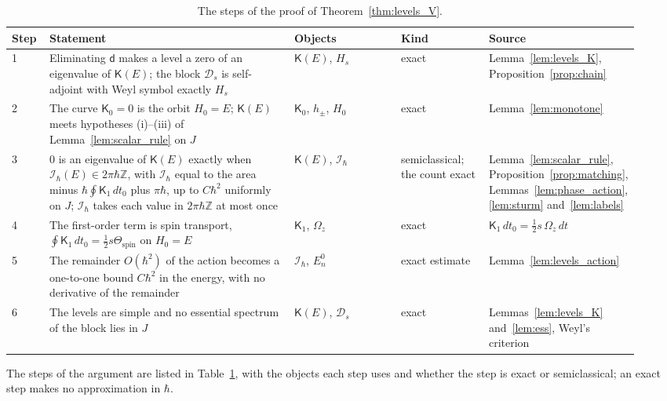 \documentclass[aps,prd,onecolumn,tightenlines,nofootinbib,notitlepage,11pt,floatfix]{revtex4-2}
\theoremstyle{indentedtheorem}
\begin{document}
\begin{table}[htbp]
\centering
\small
\setlength{\tabcolsep}{3pt}
\caption{The steps of the proof of Theorem~\ref{thm:levels_V}.}
\label{tab:proof_chain}
\begin{tabular}{p{0.06\linewidth}p{0.39\linewidth}p{0.17\linewidth}p{0.14\linewidth}p{0.17\linewidth}}
\hline
\textbf{Step} & \textbf{Statement} & \textbf{Objects} & \textbf{Kind} & \textbf{Source} \\
\hline
1 & Eliminating $\mathsf{d}$ makes a level a zero of an eigenvalue of $\mathsf{K}(E)$; the block $\mathcal{D}_s$ is self-adjoint with Weyl symbol exactly $H_s$ & $\mathsf{K}(E)$, $H_s$ & exact & Lemma~\ref{lem:levels_K}, Proposition~\ref{prop:chain} \\
2 & The curve $\mathsf{K}_0=0$ is the orbit $H_0=E$; $\mathsf{K}(E)$ meets hypotheses (i)--(iii) of Lemma~\ref{lem:scalar_rule} on $J$ & $\mathsf{K}_0$, $h_\pm$, $H_0$ & exact & Lemma~\ref{lem:monotone} \\
3 & $0$ is an eigenvalue of $\mathsf{K}(E)$ exactly when $\mathcal{I}_\hbar(E)\in2\pi\hbar\mathbb{Z}$, with $\mathcal{I}_\hbar$ equal to the area minus $\hbar\oint\mathsf{K}_1\,dt_0$ plus $\pi\hbar$, up to $C\hbar^2$ uniformly on $J$; $\mathcal{I}_\hbar$ takes each value in $2\pi\hbar\mathbb{Z}$ at most once & $\mathsf{K}(E)$, $\mathcal{I}_\hbar$ & semiclassical; the count exact & Lemma~\ref{lem:scalar_rule}, Proposition~\ref{prop:matching}, Lemmas~\ref{lem:phase_action}, \ref{lem:sturm} and~\ref{lem:labels} \\
4 & The first-order term is spin transport, $\oint\mathsf{K}_1\,dt_0=\tfrac{1}{2}s\Theta_\text{spin}$ on $H_0=E$ & $\mathsf{K}_1$, $\Omega_z$ & exact & $\mathsf{K}_1\,dt_0=\tfrac{1}{2}s\,\Omega_z\,dt$ \\
5 & The remainder $O(\hbar^2)$ of the action becomes a one-to-one bound $C\hbar^2$ in the energy, with no derivative of the remainder & $\mathcal{I}_\hbar$, $E_n^0$ & exact estimate & Lemma~\ref{lem:levels_action} \\
6 & The levels are simple and no essential spectrum of the block lies in $J$ & $\mathsf{K}(E)$, $\mathcal{D}_s$ & exact & Lemmas~\ref{lem:levels_K} and~\ref{lem:ess}, Weyl's criterion \\
\hline
\end{tabular}
\end{table}

The steps of the argument are listed in Table~\ref{tab:proof_chain}, with the objects each step uses and whether the step is exact or semiclassical; an exact step makes no approximation in $\hbar$.
\end{document}
